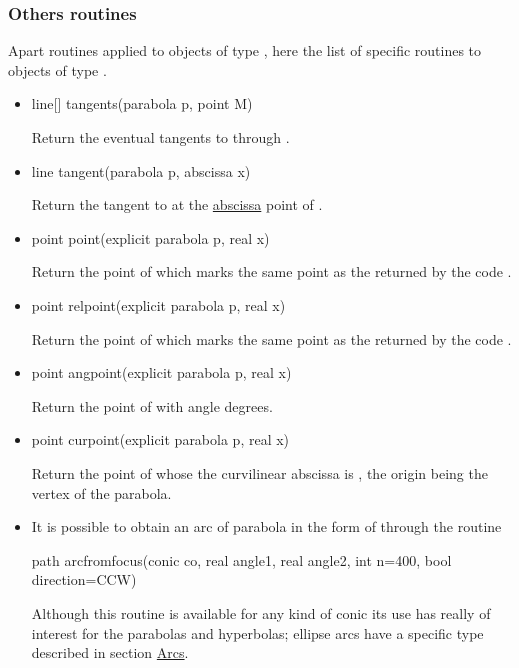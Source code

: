 \documentclass[pdftex]{article}
\begin{document}
\subsubsection{Others routines}
Apart routines applied to objects of type , here the list
of specific routines to objects of type .
\begin{itemize}
\item {}
  \begin{Vcolor}
    line[] tangents(parabola p, point M)
  \end{Vcolor}
  Return the eventual tangents to  through .
\item {}
  \begin{Vcolor}
    line tangent(parabola p, abscissa x)
  \end{Vcolor}
    Return the tangent to  at the 
  \href{#section.abscissa}{abscissa} point of .
\item {}
  \begin{Vcolor}
    point point(explicit parabola p, real x)
  \end{Vcolor}
    Return the point of  which marks the same point as the
   returned by the code .
\item {}
  \begin{Vcolor}
    point relpoint(explicit parabola p, real x)
  \end{Vcolor}
    Return the point of  which marks the same point as the
   returned by the code .
\item {}
  \begin{Vcolor}
    point angpoint(explicit parabola p, real x)
  \end{Vcolor}
  Return the point of  with angle  degrees.
\item {}
  \begin{Vcolor}
    point curpoint(explicit parabola p, real x)
  \end{Vcolor}
  Return the point of  whose the curvilinear abscissa
  is , the origin being the vertex of the parabola.
\item It is possible to obtain an arc of parabola in the form of
   through the routine 
  \begin{Vcolor}
    path arcfromfocus(conic co, real angle1, real angle2, int n=400, bool direction=CCW)
  \end{Vcolor}
  Although this routine is available for any kind of conic its use has
  really of interest for the parabolas and hyperbolas; ellipse arcs have a
  specific type described in section \href{#section.arc}{Arcs}.


\end{itemize}
\end{document}
